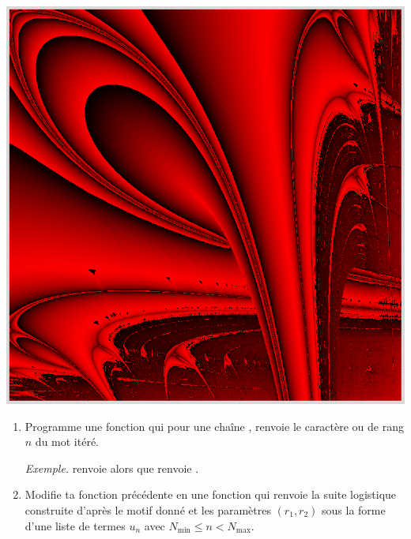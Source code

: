 \documentclass[11pt,class=report,crop=false]{standalone}
\begin{document}
\begin{activite}


\begin{center}
\includegraphics[scale=\myscale,scale=0.25]{ecran-lyapunov-AB-2-4-2-4}
\end{center}

\begin{enumerate}

  \item Programme une fonction  qui pour une chaîne , renvoie le caractère  ou  de rang $n$ du mot itéré.
  
  \emph{Exemple.}  renvoie  alors que 
   renvoie .
  
  \item Modifie ta fonction précédente en une fonction   qui renvoie
  la suite logistique construite d'après le motif donné et les paramètres $(r_1,r_2)$ sous la forme d'une liste de termes $u_n$ avec $N_{\min} \le n < N_{\max}$.
  

\end{enumerate}
\end{activite}
\end{document}
